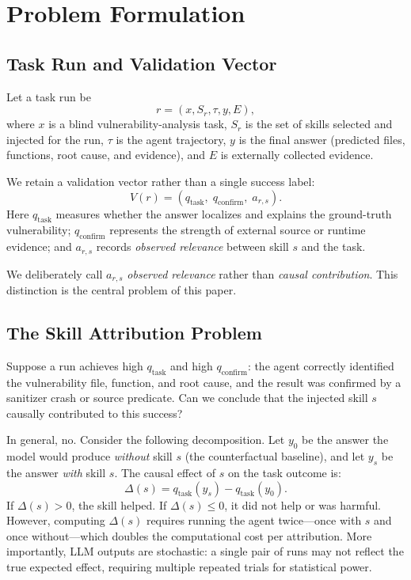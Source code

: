 ﻿\documentclass[preprint,12pt]{elsarticle}
\begin{document}
\section{Problem Formulation}
\label{sec:problem}

\subsection{Task Run and Validation Vector}

Let a task run be
\begin{equation}
    r = (x, S_r, \tau, y, E),
\end{equation}
where $x$ is a blind vulnerability-analysis task, $S_r$ is the set of
skills selected and injected for the run, $\tau$ is the agent trajectory,
$y$ is the final answer (predicted files, functions, root cause, and
evidence), and $E$ is externally collected evidence.

We retain a validation vector rather than a single success label:
\begin{equation}
    V(r) = \left(q_{\mathrm{task}},\; q_{\mathrm{confirm}},\;
    a_{r,s}\right).
\end{equation}
Here $q_{\mathrm{task}}$ measures whether the answer localizes and explains
the ground-truth vulnerability; $q_{\mathrm{confirm}}$ represents the
strength of external source or runtime evidence; and $a_{r,s}$ records
\emph{observed relevance} between skill $s$ and the task.

We deliberately call $a_{r,s}$ \emph{observed relevance} rather than
\emph{causal contribution}.  This distinction is the central problem of
this paper.

\subsection{The Skill Attribution Problem}
\label{sec:attribution_problem}

Suppose a run achieves high $q_{\mathrm{task}}$ and high
$q_{\mathrm{confirm}}$: the agent correctly identified the vulnerability
file, function, and root cause, and the result was confirmed by a sanitizer
crash or source predicate.  Can we conclude that the injected skill $s$
causally contributed to this success?

In general, no.  Consider the following decomposition.  Let $y_0$ be the
answer the model would produce \emph{without} skill $s$ (the counterfactual
baseline), and let $y_s$ be the answer \emph{with} skill $s$.  The causal
effect of $s$ on the task outcome is:
\begin{equation}
    \Delta(s) = q_{\mathrm{task}}(y_s) - q_{\mathrm{task}}(y_0).
    \label{eq:causal_effect}
\end{equation}
If $\Delta(s) > 0$, the skill helped.  If $\Delta(s) \leq 0$, it did not
help or was harmful.  However, computing $\Delta(s)$ requires running the
agent twice---once with $s$ and once without---which doubles the
computational cost per attribution.  More importantly, LLM outputs are
stochastic: a single pair of runs may not reflect the true expected
effect, requiring multiple repeated trials for statistical power.
\end{document}
